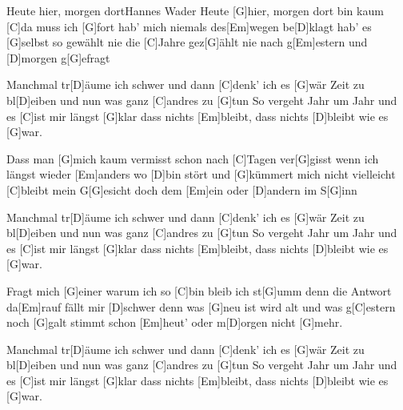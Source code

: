 \documentclass[../main.tex]{subfiles}
\begin{document}
\begin{song}{Heute hier, morgen dort}{Hannes Wader}{}
Heute [G]hier, morgen dort bin kaum [C]da muss ich [G]fort
hab' mich niemals des[Em]wegen be[D]klagt
hab' es [G]selbst so gewählt nie die [C]Jahre gez[G]{ä}hlt
nie nach g[Em]estern und [D]morgen g[G]efragt

Manchmal tr[D]{ä}ume ich schwer und dann [C]denk' ich es [G]wär
Zeit zu bl[D]eiben und nun was ganz [C]andres zu [G]tun
So vergeht Jahr um Jahr und es [C]ist mir längst [G]klar
dass nichts [Em]bleibt, dass nichts [D]bleibt wie es [G]war.

Dass man [G]mich kaum vermisst schon nach [C]Tagen ver[G]gisst
wenn ich längst wieder [Em]anders wo [D]bin
stört und [G]kümmert mich nicht vielleicht [C]bleibt mein G[G]esicht
doch dem [Em]ein oder [D]andern im S[G]inn

Manchmal tr[D]{ä}ume ich schwer und dann [C]denk' ich es [G]{w}är
Zeit zu bl[D]eiben und nun was ganz [C]andres zu [G]tun
So vergeht Jahr um Jahr und es [C]ist mir längst [G]klar
dass nichts [Em]bleibt, dass nichts [D]bleibt wie es [G]war.

Fragt mich [G]einer warum ich so [C]bin bleib ich st[G]umm
denn die Antwort da[Em]rauf fällt mir [D]schwer
denn was [G]neu ist wird alt und was g[C]estern noch [G]galt
stimmt schon [Em]heut' oder m[D]orgen nicht [G]mehr.

Manchmal tr[D]{ä}ume ich schwer und dann [C]denk' ich es [G]{w}är
Zeit zu bl[D]eiben und nun was ganz [C]andres zu [G]tun
So vergeht Jahr um Jahr und es [C]ist mir längst [G]klar
dass nichts [Em]bleibt, dass nichts [D]bleibt wie es [G]war.
\end{song}
\end{document}
